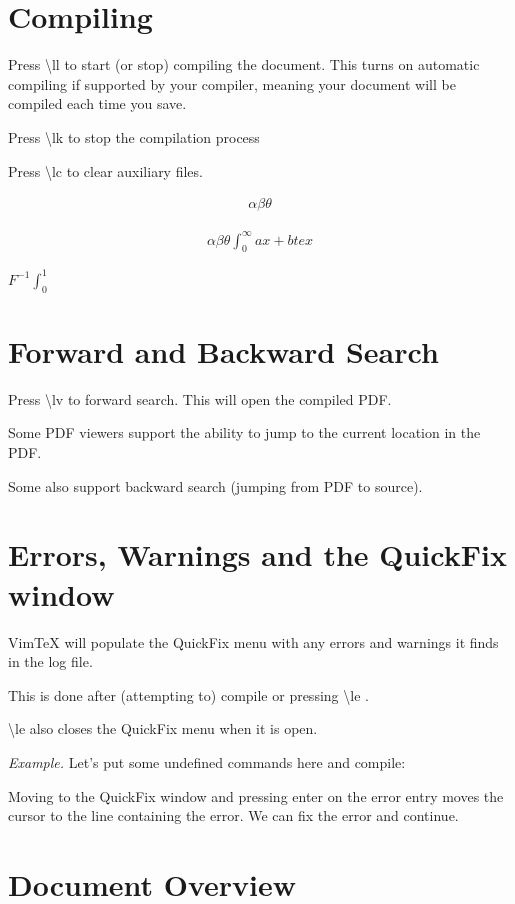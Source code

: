 \documentclass{article}
\newcommand{\lk}{\textbackslash{}lk }
\newcommand{\lv}{\textbackslash{}lv }
\newcommand{\lc}{\textbackslash{}lc }
\renewcommand{\ll}{\textbackslash{}ll }
\renewcommand{\le}{\textbackslash{}le }
\begin{document}
\section{Compiling}

Press \ll to start (or stop) compiling the document.
This turns on automatic compiling if supported by your compiler, meaning your
document will be compiled each time you save.

Press \lk to stop the compilation process

Press \lc to clear auxiliary files.


\begin{eqnarray}
	\alpha \beta \theta 
\end{eqnarray}

\begin{eqnarray}
	\alpha \beta \theta  \int_0^\infty{ax+b} {{tex}}
\end{eqnarray}


$ F^{-1}   \int_0^1 $ 


\section{Forward and Backward Search}

Press \lv to forward search. This will open the compiled PDF.

Some PDF viewers support the ability to jump to the current location in the PDF.

Some also support backward search (jumping from PDF to source).



\section{Errors, Warnings and the QuickFix window}

VimTeX will populate the QuickFix menu with any errors and warnings it finds in
the log file.

This is done after (attempting to) compile or pressing \le.

\le also closes the QuickFix menu when it is open.

\emph{Example.} Let's put some undefined commands here and compile:

Moving to the QuickFix window and pressing enter on the error entry moves the
cursor to the line containing the error. We can fix the error and continue.



\section{Document Overview}
\end{document}
